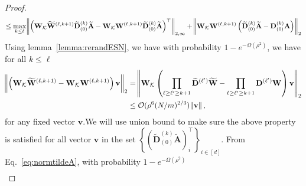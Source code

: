 \begin{proof}
\begin{align}
		\le\max_{k \le \ell} \norm{\left(\mathbf{W}_{\mathcal{K}} \widetilde{\mathbf{W}}^{(\ell, k+1)} \widetilde{\mathbf{D}}_{(0)}^{(k)} \widetilde{\mathbf{A}} - \mathbf{W}_{\mathcal{K}} \mathbf{W}^{(\ell, k+1)} \widetilde{\mathbf{D}}_{(0)}^{(k)} \widetilde{\mathbf{A}}\right)^{\top}}_{2, \infty} + \norm{\mathbf{W}_{\mathcal{K}} \mathbf{W}^{(\ell, k+1)} \left(\widetilde{\mathbf{D}}_{(0)}^{(k)} \widetilde{\mathbf{A}} - \mathbf{D}_{(0)}^{(k)} \mathbf{A}\right)}_2 
		\label{eq:tildeWWkappaWWkappa}
	\end{align}
	\endgroup
	Using lemma~\ref{lemma:rerandESN}, we have with probability $1-e^{-\Omega(\rho^2)}$, we have for all $k \le \ell$
	\begin{align*}
		\norm{\left(\mathbf{W}_{\mathcal{K}} \widetilde{\mathbf{W}}^{(\ell, k+1)}  - \mathbf{W}_{\mathcal{K}} \mathbf{W}^{(\ell, k+1)} \right) \mathbf{v}}_2 &= \norm{\mathbf{W}_{\mathcal{K}} \left(\prod_{\ell \ge \ell' \ge k+1} \widetilde{\mathbf{D}}^{(\ell')} \widetilde{\mathbf{W}} - \prod_{\ell \ge \ell' \ge k+1} \mathbf{D}^{(\ell')} \mathbf{W}\right) \mathbf{v}}_2 \\& \le \mathcal{O}(\rho^6 (N/m)^{2/3}) \norm{\mathbf{v}}, 
	\end{align*}
	for any fixed vector $\mathbf{v}$.We will use union bound to make sure the above property is satisfied for all vector $\mathbf{v}$ in the set $ \left\{\left(\widetilde{\mathbf{D}}_{(0)}^{(k)} \widetilde{\mathbf{A}}\right)^{\top}_i\right\}_{i \in [d]}$. From Eq.~\ref{eq:normtildeA}, with probability $1-e^{-\Omega(\rho^2)}$
	\begin{align*}

\end{align*}
\end{proof}
